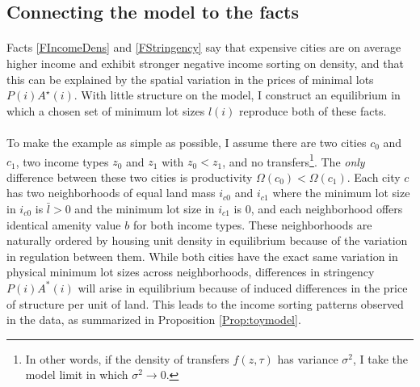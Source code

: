 \documentclass[]{article}
\begin{document}
\subsection{Connecting the model to the facts}
\paragraph*{}
Facts \ref{FIncomeDens} and \ref{FStringency} say that expensive cities are on average higher income and exhibit stronger negative income sorting on density, and that this can be explained by the spatial variation in the prices of minimal lots $P(i)A^{\star}(i)$. With little structure on the model, I construct an equilibrium in which a chosen set of minimum lot sizes $l(i)$ reproduce both of these facts. 
\paragraph*{}
To make the example as simple as possible, I assume there are two cities $c_{0}$ and $c_{1}$, two income types $z_{0}$ and $z_{1}$ with $z_{0} < z_{1}$, and no transfers\footnote{In other words, if the density of transfers $f(z, \tau)$ has variance $\sigma^{2}$, I take the model limit in which $\sigma^{2} \to 0$.}. The \textit{only} difference between these two cities is productivity $\Omega(c_{0}) < \Omega(c_{1})$. Each city $c$ has two neighborhoods of equal land mass $i_{c0}$ and $i_{c1}$ where the minimum lot size in $i_{c0}$ is $\bar{l} > 0$ and the minimum lot size in $i_{c1}$ is 0, and each neighborhood offers identical amenity value $b$ for both income types. These neighborhoods are naturally ordered by housing unit density in equilibrium because of the variation in regulation between them. While both cities have the exact same variation in physical minimum lot sizes across neighborhoods, differences in stringency $P(i)A^{*}(i)$ will arise in equilibrium because of induced differences in the price of structure per unit of land. This leads to the income sorting patterns observed in the data, as summarized in Proposition \ref{Prop:toymodel}.
\end{document}
